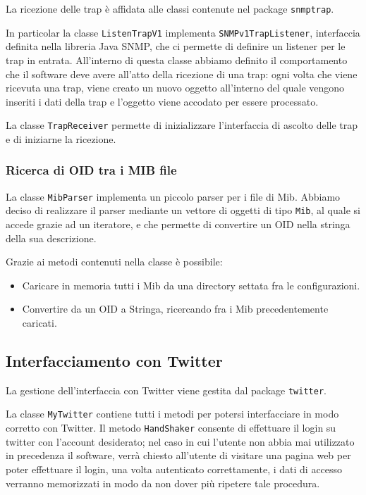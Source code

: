 \documentclass[a4paper, 10pt]{article}
\begin{document}
La ricezione delle trap \`e affidata alle classi contenute nel package \texttt{snmptrap}.

In particolar la classe \texttt{ListenTrapV1} implementa \texttt{SNMPv1TrapListener}, interfaccia definita nella libreria Java SNMP, che ci permette di definire un listener per le trap in entrata. All'interno di questa classe abbiamo definito il comportamento che il software deve avere all'atto della ricezione di una trap: ogni volta che viene ricevuta una trap, viene creato un nuovo oggetto all'interno del quale vengono inseriti i dati della trap e l'oggetto viene accodato per essere processato.

La classe \texttt{TrapReceiver} permette di inizializzare l'interfaccia di ascolto delle trap e di iniziarne la ricezione.

\subsubsection{Ricerca di OID tra i MIB file}

La classe \texttt{MibParser} implementa un piccolo parser per i file di Mib.
Abbiamo deciso di realizzare il parser mediante un vettore di oggetti di tipo \texttt{Mib}, al quale si accede grazie ad un iteratore, e che permette di convertire un OID nella stringa della sua descrizione.

Grazie ai metodi contenuti nella classe \`e possibile:
\begin{itemize}
	\item Caricare in memoria tutti i Mib da una directory settata fra le configurazioni.
	\item Convertire da un OID a Stringa, ricercando fra i Mib precedentemente caricati.
\end{itemize} 

\subsection{Interfacciamento con Twitter}

La gestione dell'interfaccia con Twitter viene gestita dal package \texttt{twitter}.

La classe \texttt{MyTwitter} contiene tutti i metodi per potersi interfacciare in modo corretto con Twitter. Il metodo \texttt{HandShaker} consente di effettuare il login su twitter con l'account desiderato; nel caso in cui l'utente non abbia mai utilizzato in precedenza il software, verr\`a chiesto all'utente di visitare una pagina web per poter effettuare il login, una volta autenticato correttamente, i dati di accesso verranno memorizzati in modo da non dover pi\`u ripetere tale procedura.
\end{document}
